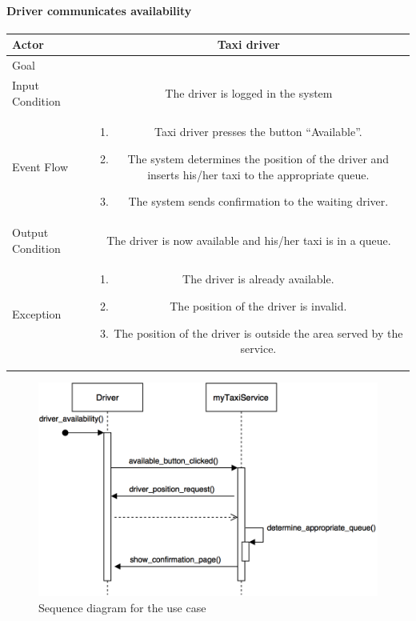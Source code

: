 \documentclass[a4paper,12pt,dvipsnames]{article}%
\newcommand{\usecasetable}[6]{
\begin{center}
\def\arraystretch{1.5}
\begin{tabularx}{\textwidth}{|s|C|}
\hline
Actor & #1\\
\hline
Goal & #2\\
\hline
Input Condition & #3 \\
\hline
Event Flow & #4\\
\hline
Output Condition & #5\\
\hline
Exception & #6\\
\hline
\end{tabularx}
\end{center}
}
\begin{document}
\paragraph{Driver communicates availability}
\usecasetable{Taxi driver}{}{The driver is logged in the system}
{
\begin{minipage}[b]{11cm}
\begin{enumerate}
\item Taxi driver presses the button ``Available''.
\item The system determines the position of the driver and inserts his/her taxi to the appropriate queue.
\item The system sends confirmation to the waiting driver.
\end{enumerate}
\end{minipage}
}
{The driver is now available and his/her taxi is in a queue.}
{
\begin{minipage}[b]{11cm}
\begin{enumerate}
\item The driver is already available.
\item The position of the driver is invalid.
\item The position of the driver is outside the area served by the service.
\end{enumerate}
\end{minipage}
}
\begin{figure}[H]
\centering
\includegraphics[scale=.3]{driver_availability.png}
\caption{Sequence diagram for the use case}
\end{figure}
\break
\end{document}
